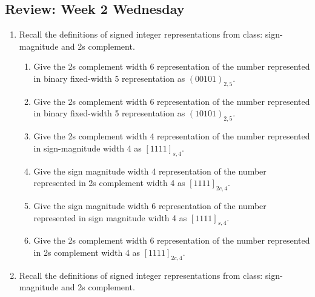 \documentclass[12pt, oneside]{article}
\begin{document}
\subsection*{Review: Week 2 Wednesday}
\begin{enumerate}
    \item {

Recall the definitions of signed integer representations from class: 
sign-magnitude and 2s complement.

\begin{enumerate}
    \item Give the 2s complement width 6 representation of the number 
    represented in binary fixed-width 5
    representation as $(00101)_{2,5}$. 
    \item Give the 2s complement width 6 representation of the number 
    represented in binary fixed-width 5
    representation as $(10101)_{2,5}$. 
    \item Give the 2s complement width 4 representation of the number 
    represented in sign-magnitude
    width 4 as $[1111]_{s,4}$.
    \item Give the sign magnitude width 4 representation of the number 
    represented in 2s complement
    width 4 as $[1111]_{2c,4}$.
    \item Give the sign magnitude width 6 representation of the number 
    represented in sign magnitude width 4 as $[1111]_{s,4}$.
    \item Give the 2s complement width 6 representation of the number 
    represented in 2s complement width 4 as $[1111]_{2c,4}$.
\end{enumerate} }
    \item {

Recall the definitions of signed integer representations from class: 
sign-magnitude and 2s complement.

}
\end{enumerate}
\end{document}
